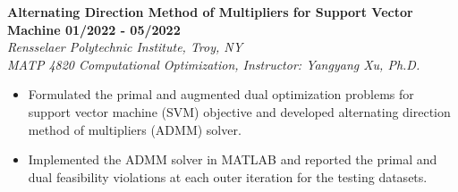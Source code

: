 \documentclass[letterpaper, 11pt]{article}
\newcommand{\subsectionvspace}{\vspace{8pt}}
\begin{document}
    \subsectionvspace

    \textbf{Alternating Direction Method of Multipliers for Support Vector Machine \hfill 01/2022 - 05/2022} \\
    \textit{Rensselaer Polytechnic Institute, Troy, NY} \\
    \textit{MATP 4820 Computational Optimization, Instructor: Yangyang Xu, Ph.D.}
    \begin{itemize}
        \item Formulated the primal and augmented dual optimization problems for support vector machine (SVM) objective and developed alternating direction method of multipliers (ADMM) solver.
        \item Implemented the ADMM solver in MATLAB and reported the primal and dual feasibility violations at each outer iteration for the testing datasets.
    \end{itemize}




\end{document}
